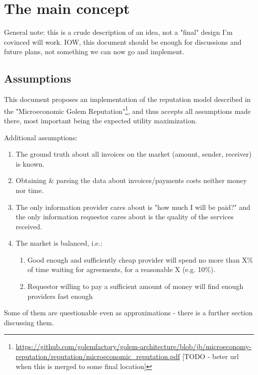 \documentclass{article}
\begin{document}
\section{The main concept}

General note: this is a crude description of an idea, not a "final" design I'm covinced will work.
IOW, this document should be enough for discussions and future plans, not something we can now go and implement.

\subsection{Assumptions}

This document proposes an implementation of the reputation model described in the "Microeconomic Golem Reputation"\footnote{
\href{https://github.com/golemfactory/golem-architecture/blob/jb/microeconomy-reputation/reputation/microeconomic\_reputation.pdf}
     {https://github.com/golemfactory/golem-architecture/blob/jb/microeconomy-reputation/reputation/microeconomic\_reputation.pdf}
[TODO - beter url when this is merged to some final location]}, and thus accepts all assumptions made there, most important being
the expected utility maximization.
    
Additional assumptions:

\begin{enumerate}
    \item The ground truth about all invoices on the market (amount, sender, receiver) is known.
    \item Obtaining \& parsing the data about invoices/payments costs neither money nor time.
    \item The only information provider cares about is "how much I will be paid?" and the only information requestor cares about
        is the quality of the services received.
    \item The market is balanced, i.e.: 
        \begin{enumerate}
            \item Good enough and sufficiently cheap provider will spend no more than X\% of time waiting for agreements, for a reasonable X (e.g. 10\%).
            \item Requestor willing to pay a sufficient amount of money will find enough providers fast enough
        \end{enumerate}
\end{enumerate}

Some of them are questionable even as approximations - there is a further section discussing them.
\end{document}

